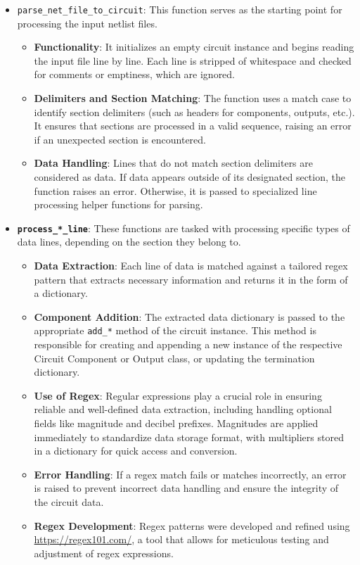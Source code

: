 \documentclass[conference]{IEEEtran}
\begin{document}
\begin{itemize}
  \item {\texttt{parse\_net\_file\_to\_circuit}}: This function serves as the starting point for processing the input netlist files.
        \begin{itemize}
          \item \textbf{Functionality}: It initializes an empty circuit instance and begins reading the input file line by line. 
          Each line is stripped of whitespace and checked for comments or emptiness, which are ignored.
          \item \textbf{Delimiters and Section Matching}: The function uses a match case to identify section delimiters 
          (such as headers for components, outputs, etc.). It ensures that sections are processed in a valid sequence, 
          raising an error if an unexpected section is encountered.
          \item \textbf{Data Handling}: Lines that do not match section delimiters are considered as data. If data appears 
          outside of its designated section, the function raises an error. Otherwise, it is passed to specialized line processing 
          helper functions for parsing.
        \end{itemize}

  \item \textbf{\texttt{process\_*\_line}}: These functions are tasked with processing specific types of data lines, depending on 
  the section they belong to.
        \begin{itemize}
          \item \textbf{Data Extraction}: Each line of data is matched against a tailored regex pattern that extracts necessary 
          information and returns it in the form of a dictionary.
          \item \textbf{Component Addition}: The extracted data dictionary is passed to the appropriate \texttt{add\_*} method 
          of the circuit instance. This method is responsible for creating and appending a new instance of the respective Circuit 
          Component or Output class, or updating the termination dictionary.
          \item \textbf{Use of Regex}: Regular expressions play a crucial role in ensuring reliable and well-defined data extraction, 
          including handling optional fields like magnitude and decibel prefixes. Magnitudes are applied immediately to standardize 
          data storage format, with multipliers stored in a dictionary for quick access and conversion.
          \item \textbf{Error Handling}: If a regex match fails or matches incorrectly, an error is raised to prevent incorrect data 
          handling and ensure the integrity of the circuit data.
          \item \textbf{Regex Development}: Regex patterns were developed and refined using \url{https://regex101.com/}, a tool that 
          allows for meticulous testing and adjustment of regex expressions.
        \end{itemize}
\end{itemize}
\end{document}
